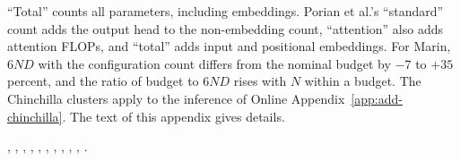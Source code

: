 \begin{table}[tp]
\begin{tablenotes}
``Total'' counts all parameters, including embeddings. Porian et al.'s ``standard'' count adds the output head to the
non-embedding count, ``attention'' also adds attention FLOPs, and ``total'' adds input and positional embeddings.
For Marin, $6ND$ with the configuration count differs from the nominal budget by $-7$ to $+35$ percent, and the
ratio of budget to $6ND$ rises with $N$ within a budget. The Chinchilla clusters apply to the inference of Online
Appendix~\ref{app:add-chinchilla}. The text of this appendix gives details.
\end{tablenotes}
\begin{tablenotes}[Source]
\citet{hoffmann2022training}, \citet{besiroglu2024chinchilla}, \citet{li2025predictableb}, \citet{gadre2024language},
\citet{bhagia2024establishing}, \citet{muennighoff2023scaling}, \citet{magnusson2025datadecide},
\citet{czech2026llama3isoflop}, \citet{marin2026ladders}, \citet{porian2024resolving}, \citet{li2025predictablea}.
\end{tablenotes}
\end{table}
